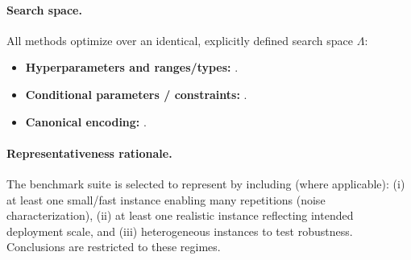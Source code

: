 \paragraph{Search space.}
All methods optimize over an identical, explicitly defined search space \(\Lambda\):
\begin{itemize}
    \item \textbf{Hyperparameters and ranges/types:} \SearchSpaceList{}.
    \item \textbf{Conditional parameters / constraints:} \SearchSpaceConditionals{}.
    \item \textbf{Canonical encoding:} \SearchSpaceEncoding{}.
\end{itemize}

\paragraph{Representativeness rationale.}
The benchmark suite is selected to represent \ClaimedDomain{} by including (where applicable):
(i) at least one small/fast instance enabling many repetitions (noise characterization),
(ii) at least one realistic instance reflecting intended deployment scale,
and (iii) heterogeneous instances to test robustness.
Conclusions are restricted to these regimes.
